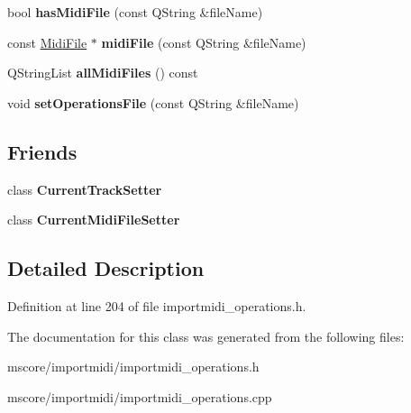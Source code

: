 \begin{DoxyCompactItemize}
bool {\bfseries has\+Midi\+File} (const Q\+String \&file\+Name)
\item 
\mbox{\label{class_ms_1_1_midi_operations_1_1_data_a6b40afbfcf731190aeb24aee7ab1d5b0}} 
const \hyperlink{class_ms_1_1_midi_file}{Midi\+File} $\ast$ {\bfseries midi\+File} (const Q\+String \&file\+Name)
\item 
\mbox{\label{class_ms_1_1_midi_operations_1_1_data_a8852d57dce69271b3c1fb2f1a6b1554c}} 
Q\+String\+List {\bfseries all\+Midi\+Files} () const
\item 
\mbox{\label{class_ms_1_1_midi_operations_1_1_data_ac99c67c107ed5d3f74b7800c2ce386be}} 
void {\bfseries set\+Operations\+File} (const Q\+String \&file\+Name)
\end{DoxyCompactItemize}
\subsection*{Friends}
\begin{DoxyCompactItemize}
\item 
\mbox{\label{class_ms_1_1_midi_operations_1_1_data_aabcc64da696082d9199d1a01e6bdde2a}} 
class {\bfseries Current\+Track\+Setter}
\item 
\mbox{\label{class_ms_1_1_midi_operations_1_1_data_aea628e8ef2c0573de2e148131ed404a9}} 
class {\bfseries Current\+Midi\+File\+Setter}
\end{DoxyCompactItemize}


\subsection{Detailed Description}


Definition at line 204 of file importmidi\+\_\+operations.\+h.



The documentation for this class was generated from the following files\+:\begin{DoxyCompactItemize}
\item 
mscore/importmidi/importmidi\+\_\+operations.\+h\item 
mscore/importmidi/importmidi\+\_\+operations.\+cpp\end{DoxyCompactItemize}
